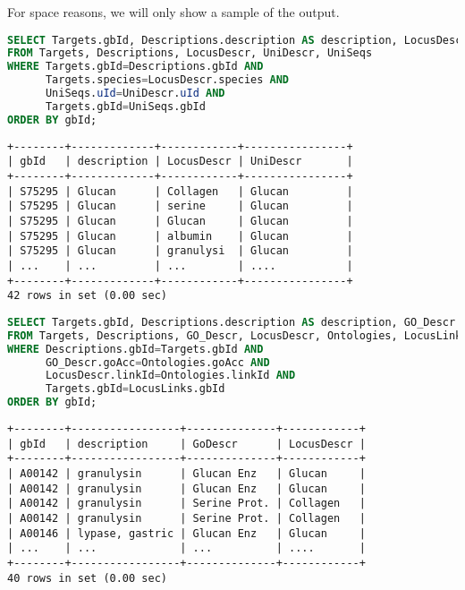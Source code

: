 For space reasons, we will only show a sample of the output.

\begin{lstlisting}[language=sql]
SELECT Targets.gbId, Descriptions.description AS description, LocusDescr.description AS LocusDescr, UniDescr.description AS UniDescr
FROM Targets, Descriptions, LocusDescr, UniDescr, UniSeqs
WHERE Targets.gbId=Descriptions.gbId AND
      Targets.species=LocusDescr.species AND
      UniSeqs.uId=UniDescr.uId AND
      Targets.gbId=UniSeqs.gbId
ORDER BY gbId;
\end{lstlisting}

\begin{lstlisting}[style=output]
+--------+-------------+------------+----------------+
| gbId   | description | LocusDescr | UniDescr       |
+--------+-------------+------------+----------------+
| S75295 | Glucan      | Collagen   | Glucan         |
| S75295 | Glucan      | serine     | Glucan         |
| S75295 | Glucan      | Glucan     | Glucan         |
| S75295 | Glucan      | albumin    | Glucan         |
| S75295 | Glucan      | granulysi  | Glucan         |
| ...    | ...         | ...        | ....           |
+--------+-------------+------------+----------------+
42 rows in set (0.00 sec)
\end{lstlisting}

\begin{lstlisting}[language=sql]
SELECT Targets.gbId, Descriptions.description AS description, GO_Descr.description AS GO_Descr, LocusDescr.description AS LocusDescr
FROM Targets, Descriptions, GO_Descr, LocusDescr, Ontologies, LocusLinks
WHERE Descriptions.gbId=Targets.gbId AND
      GO_Descr.goAcc=Ontologies.goAcc AND
      LocusDescr.linkId=Ontologies.linkId AND
      Targets.gbId=LocusLinks.gbId
ORDER BY gbId;
\end{lstlisting}

\begin{lstlisting}[style=output]
+--------+-----------------+--------------+------------+
| gbId   | description     | GoDescr      | LocusDescr |
+--------+-----------------+--------------+------------+
| A00142 | granulysin      | Glucan Enz   | Glucan     |
| A00142 | granulysin      | Glucan Enz   | Glucan     |
| A00142 | granulysin      | Serine Prot. | Collagen   |
| A00142 | granulysin      | Serine Prot. | Collagen   |
| A00146 | lypase, gastric | Glucan Enz   | Glucan     |
| ...    | ...             | ...          | ....       |
+--------+-----------------+--------------+------------+
40 rows in set (0.00 sec)
\end{lstlisting}

